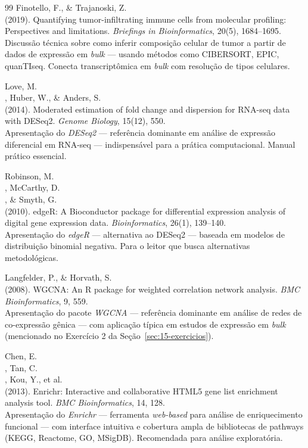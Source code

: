\begin{thebibliography}{99}
 Finotello, F., \& Trajanoski, Z.\\ (2019). Quantifying tumor-infiltrating immune cells from molecular profiling: Perspectives and limitations. \emph{Briefings in Bioinformatics}, 20(5), 1684--1695.\\ Discussão técnica sobre como inferir composição celular de tumor a partir de dados de expressão em \emph{bulk} --- usando métodos como CIBERSORT, EPIC, quanTIseq. Conecta transcriptômica em \emph{bulk} com resolução de tipos celulares.

 Love, M.\\, Huber, W., \& Anders, S.\\ (2014). Moderated estimation of fold change and dispersion for RNA-seq data with DESeq2. \emph{Genome Biology}, 15(12), 550.\\ Apresentação do \emph{DESeq2} --- referência dominante em análise de expressão diferencial em RNA-seq --- indispensável para a prática computacional. Manual prático essencial.

 Robinson, M.\\, McCarthy, D.\\, \& Smyth, G.\\ (2010). edgeR: A Bioconductor package for differential expression analysis of digital gene expression data. \emph{Bioinformatics}, 26(1), 139--140.\\ Apresentação do \emph{edgeR} --- alternativa ao DESeq2 --- baseada em modelos de distribuição binomial negativa. Para o leitor que busca alternativas metodológicas.

 Langfelder, P., \& Horvath, S.\\ (2008). WGCNA: An R package for weighted correlation network analysis. \emph{BMC Bioinformatics}, 9, 559.\\ Apresentação do pacote \emph{WGCNA} --- referência dominante em análise de redes de co-expressão gênica --- com aplicação típica em estudos de expressão em \emph{bulk} (mencionado no Exercício 2 da Seção~\ref{sec:15-exercicios}).

 Chen, E.\\, Tan, C.\\, Kou, Y., et al.\\ (2013). Enrichr: Interactive and collaborative HTML5 gene list enrichment analysis tool. \emph{BMC Bioinformatics}, 14, 128.\\ Apresentação do \emph{Enrichr} --- ferramenta \emph{web-based} para análise de enriquecimento funcional --- com interface intuitiva e cobertura ampla de bibliotecas de pathways (KEGG, Reactome, GO, MSigDB). Recomendada para análise exploratória.


\end{thebibliography}
